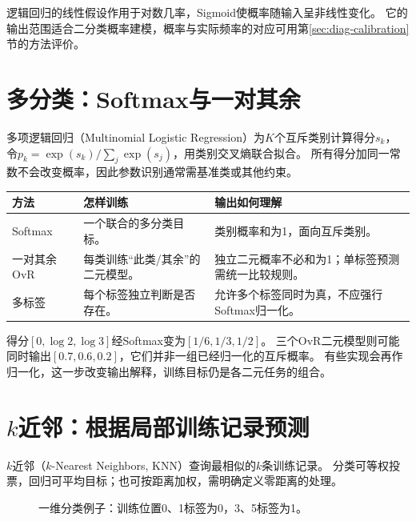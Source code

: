 逻辑回归的线性假设作用于对数几率，Sigmoid使概率随输入呈非线性变化。
它的输出范围适合二分类概率建模，概率与实际频率的对应可用第\ref{sec:diag-calibration}节的方法评价。

\section{多分类：Softmax与一对其余}
\label{sec:linear-multiclass}
多项逻辑回归（Multinomial Logistic Regression）为$K$个互斥类别计算得分$s_k$，
令$p_k=\exp(s_k)/\sum_j\exp(s_j)$，用类别交叉熵联合拟合。
所有得分加同一常数不会改变概率，因此参数识别通常需基准类或其他约束。

\begin{center}
\begin{tabularx}{\textwidth}{P{28mm}YY}
\toprule
方法 & 怎样训练 & 输出如何理解\\
\midrule
Softmax & 一个联合的多分类目标。 & 类别概率和为1，面向互斥类别。\\
一对其余 OvR & 每类训练“此类/其余”的二元模型。 & 独立二元概率不必和为1；单标签预测需统一比较规则。\\
多标签 & 每个标签独立判断是否存在。 & 允许多个标签同时为真，不应强行Softmax归一化。\\
\bottomrule
\end{tabularx}
\end{center}

得分$[0,\log2,\log3]$经Softmax变为$[1/6,1/3,1/2]$。
三个OvR二元模型则可能同时输出$[0.7,0.6,0.2]$，它们并非一组已经归一化的互斥概率。
有些实现会再作归一化，这一步改变输出解释，训练目标仍是各二元任务的组合。


\section{\texorpdfstring{$k$}{k}近邻：根据局部训练记录预测}
\label{sec:linear-knn}
$k$近邻（$k$-Nearest Neighbors, KNN）查询最相似的$k$条训练记录。
分类可等权投票，回归可平均目标；也可按距离加权，需明确定义零距离的处理。

\begin{figure}[htbp]
\centering
\caption{一维分类例子：训练位置0、1标签为0，3、5标签为1。}
\par\smallskip
{}
\end{figure}

